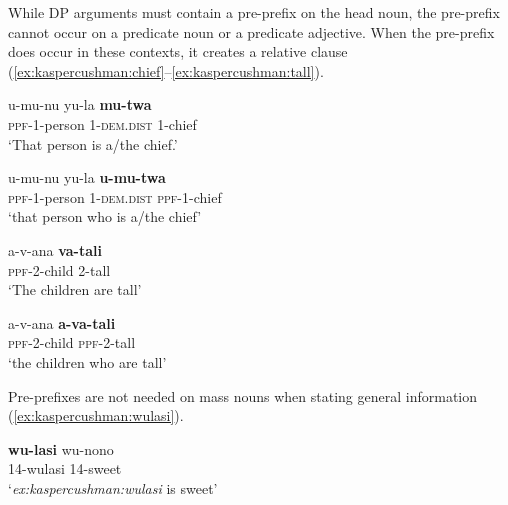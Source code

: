 \documentclass[output=paper,modfonts,nonflat]{langsci/langscibook}
\begin{document}
\begin{exe}
\end{exe}

While DP arguments must contain a pre-prefix on the head noun, the pre-prefix cannot occur on a predicate noun or a predicate adjective. When the pre-prefix does occur in these contexts, it creates a relative clause (\ref{ex:kaspercushman:chief}--\ref{ex:kaspercushman:tall}). 

\begin{exe}
\ex \label{ex:kaspercushman:chief} \begin{xlist}

\ex 
\gll u-mu-nu yu-la \textbf{mu-twa} \\
\textsc{ppf}-1-person 1-\textsc{dem.dist} 1-chief \\
\glt `That person is a/the chief.'


\ex 
\gll u-mu-nu yu-la \textbf{u-mu-twa} \\
\textsc{ppf}-1-person 1-\textsc{dem.dist} \textsc{ppf}-1-chief \\
\glt `that person who is a/the chief'

\end{xlist}
\end{exe}

\begin{exe}

\ex \label{ex:kaspercushman:tall} \begin{xlist}

\ex 
\gll a-v-ana \textbf{va-tali} \\
\textsc{ppf}-2-child 2-tall  \\
\glt `The children are tall'


\ex 
\gll a-v-ana \textbf{a-va-tali} \\
\textsc{ppf}-2-child \textsc{ppf}-2-tall \\
\glt `the children who are tall'

\end{xlist}
\end{exe}

Pre-prefixes are not needed on mass nouns when stating general information (\ref{ex:kaspercushman:wulasi}). 


\begin{exe}

\ex \label{ex:kaspercushman:wulasi} 
\gll \textbf{wu-lasi} wu-nono \\
14-wulasi 14-sweet \\
\glt `\textit{ex:kaspercushman:wulasi} is sweet'

\end{exe}
\end{document}
